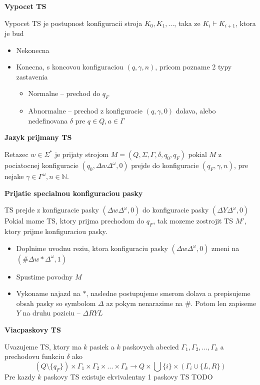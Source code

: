 \documentclass[12pt]{article}
\begin{document}
\textbf{Vypocet TS}

Vypocet TS je postupnost konfiguracii stroja $K_{0}, K_{1}, ...$, taka ze $K_{i} \vdash K_{i+1}$, ktora je bud
\begin{itemize}
	\item Nekonecna
	\item Konecna, s koncovou konfiguraciou $(q,\gamma,n)$, pricom pozname 2 typy zastavenia
		\begin{itemize}
			\item Normalne -- prechod do $q_{F}$
			\item Abnormalne -- prechod z konfiguracie $(q,\gamma,0)$ dolava, alebo nedefinovana $\delta$ pre $q \in Q, a \in \Gamma$
		\end{itemize}
\end{itemize}

\textbf{Jazyk prijmany TS}

Retazec $w \in \Sigma^{*}$ je prijaty strojom $M = (Q,\Sigma,\Gamma,\delta,q_{0},q_{F})$ pokial $M$ z pociatocnej konfiguracie
$(q_{0},\Delta w \Delta^{\omega}, 0)$ prejde do konfiguracie $(q_{F}, \gamma, n)$, pre nejake $\gamma \in \Gamma^{\omega}, n \in \mathbb{N}$.

\textbf{Prijatie specialnou konfiguraciou pasky}

TS prejde z konfiguracie pasky $(\Delta w \Delta^{\omega}, 0)$ do konfiguracie pasky $(\Delta Y \Delta^{\omega}, 0)$\\
Pokial mame TS, ktory prijma prechodom do $q_{F}$, tak mozeme zostrojit TS $M'$, ktory prijme konfiguraciou pasky.

\begin{itemize}
	\item Doplnime uvodnu reziu, ktora konfiguraciu pasky $(\Delta w \Delta^{\omega}, 0)$ zmeni na
		$(\#\Delta w * \Delta^{\omega}, 1)$
	\item Spustime povodny $M$
	\item Vykoname najazd na $*$, nasledne postupujeme smerom dolava a prepisujeme obsah pasky so symbolom $\Delta$
		az pokym nenarazime na $\#$. Potom len zapiseme $Y$ na druhu poziciu -- $\Delta RYL$
\end{itemize}

\textbf{Viacpaskovy TS}

Uvazujeme TS, ktory ma $k$ pasiek a $k$ paskovych abecied $\Gamma_{1}, \Gamma_{2}, ..., \Gamma_{k}$
a prechodovu funkciu $\delta$ ako
\begin{equation*}
	(Q \setminus \{q_{F}\}) \times \Gamma_{1} \times \Gamma_{2} \times ... \times \Gamma_{k} \to Q \times \bigcup \{i\} \times (\Gamma_{i} \cup \{L,R\})
\end{equation*}
Pre kazdy $k$ paskovy TS existuje ekvivalentny 1 paskovy TS
TODO
\end{document}
